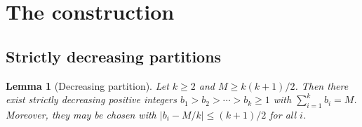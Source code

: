﻿\documentclass[11pt,a4paper]{article}
\theoremstyle{plain}
\newtheorem{lemma}[theorem]{Lemma}
\theoremstyle{definition}
\theoremstyle{remark}
\begin{document}
\section{The construction}\label{sec:construction}

\subsection{Strictly decreasing partitions}

\begin{lemma}[Decreasing partition]\label{lem:partition}
Let $k\ge2$ and $M\ge k(k+1)/2$.  Then there exist strictly decreasing
positive integers $b_1>b_2>\cdots>b_k\ge1$ with $\sum_{i=1}^k b_i=M$.
Moreover, they may be chosen with $|b_i-M/k|\le(k+1)/2$ for all $i$.
\end{lemma}
\end{document}
